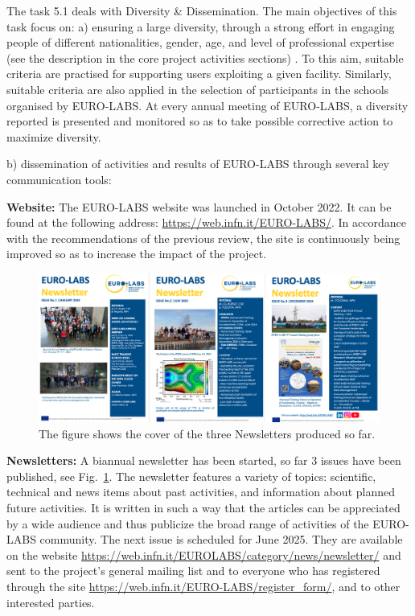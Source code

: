 The task 5.1 deals with Diversity \& Dissemination.
The main objectives of this task focus on:
a) ensuring a large diversity, through a strong effort in engaging people of different nationalities, gender, age, and level of professional expertise (see the description in the core project activities sections) . To this aim, suitable criteria are practised for supporting users exploiting a given facility. Similarly, suitable criteria are also applied in the selection of participants in the schools organised by EURO-LABS. At every annual meeting of EURO-LABS, a diversity reported is presented and monitored so as to take possible corrective action to maximize diversity.

b) dissemination of activities and results of EURO-LABS through several key communication tools:

\textbf{Website:}
The EURO-LABS website was launched in October 2022. It can be found at the following address: \url{https://web.infn.it/EURO-LABS/}. In accordance with the recommendations of the previous review, the site is continuously being improved so as to increase the impact of the project.

\begin{figure}[!h]
    \centering
    \includegraphics[width=1.0\linewidth]{graphics/Newletter_figure.png}
    \caption{The figure shows the cover of the three Newsletters produced so far.
}
    \label{fig:Newletter_figure}
\end{figure}

\textbf{Newsletters:} 
A biannual newsletter has been started, so far 3 issues have been published, see Fig.~\ref{fig:Newletter_figure}. The newsletter features a variety of topics: scientific, technical and news items about past activities, and information about planned future activities. It is written in such a way that the articles can be appreciated by a wide audience and thus publicize the broad range of activities of the EURO-LABS community. The next issue  is scheduled for June 2025. 
They are available on the website \url{https://web.infn.it/EUROLABS/category/news/newsletter/} and sent to the project's general mailing list and to everyone who has registered through the site
\url{https://web.infn.it/EURO-LABS/register_form/}, and to other interested parties.

